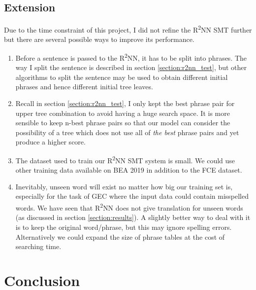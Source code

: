 \documentclass[12pt,a4paper,twoside,openright]{report}
\begin{document}
\section{Extension}\label{section:extension}
Due to the time constraint of this project, I did not refine the R\textsuperscript{2}NN SMT further but there are several possible ways to improve its performance.

\begin{enumerate}
    \item Before a sentence is passed to the R\textsuperscript{2}NN, it has to be split into phrases. The way I split the sentence is described in section \ref{section:r2nn_test}, but other algorithms to split the sentence may be used to obtain different initial phrases and hence different initial tree leaves.
    
    \item Recall in section \ref{section:r2nn_test}, I only kept the best phrase pair for upper tree combination to avoid having a huge search space. It is more sensible to keep n-best phrase pairs so that our model can consider the possibility of a tree which does not use all of \textit{the best} phrase pairs and yet produce a higher score.
    
    \item The dataset used to train our R\textsuperscript{2}NN SMT system is small. We could use other training data available on BEA 2019\cite{bryant-etal-2019-bea} in addition to the FCE dataset.
    
    \item Inevitably, unseen word will exist no matter how big our training set is, especially for the task of GEC where the input data could contain misspelled words. We have seen that R\textsuperscript{2}NN does not give translation for unseen words (as discussed in section \ref{section:results}). A slightly better way to deal with it is to keep the original word/phrase, but this may ignore spelling errors. Alternatively we could expand the size of phrase tables at the cost of searching time.
\end{enumerate}


\chapter{Conclusion}
\end{document}
